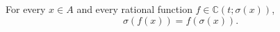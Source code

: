 For every $x \in A$ and every rational function $f \in \mathbb{C}(t; \sigma(x))$,
$$\sigma(f(x)) = f(\sigma(x)).$$
